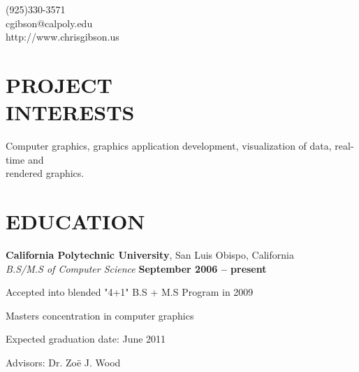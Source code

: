 \documentclass[margin,line]{resume}
\begin{document}
{
	\sc
    \hfill (925)330-3571                  \vspace{0mm}\\\vspace{0mm}%
    \hfill cgibson@calpoly.edu            \vspace{0mm}\\\vspace{0mm}%
    \hfill http://www.chrisgibson.us      \vspace{0mm}\\\vspace{-10mm}%
}

\begin{resume}

\vspace{6mm}

    \section{\mysidestyle \textbf{\large{P}\small{ROJECT\\INTERESTS}}}

	Computer graphics, graphics application development, visualization of data, real-time and \\
	rendered graphics.

\sectionline

    \section{\mysidestyle \textbf{\large{E}\small{DUCATION}}}

    \textbf{\listing California Polytechnic University}, San Luis Obispo, California \vspace{2mm}\\\vspace{1mm}%
    \textsl{B.S/M.S of Computer Science} \hfill \textbf{ September 2006 -- present}\vspace{-3mm}\\\vspace{-1mm}%
    \begin{list2}
    	\item Accepted into blended "4+1" B.S + M.S Program in 2009
        \item Masters concentration in computer graphics
        \item Expected graduation date: June 2011
        \item Advisors:  Dr. Zo\"{e} J. Wood
    \end{list2}\vspace{-1.5mm}



\end{resume}
\end{document}
